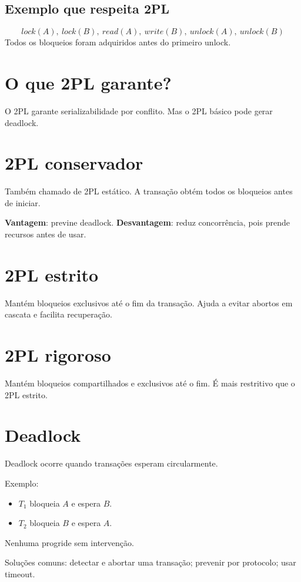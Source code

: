 \documentclass[12pt,a4paper]{article}
\begin{document}
\subsection{Exemplo que respeita 2PL}
\[
lock(A),\ lock(B),\ read(A),\ write(B),\ unlock(A),\ unlock(B)
\]
Todos os bloqueios foram adquiridos antes do primeiro unlock.

\section{O que 2PL garante?}
O 2PL garante serializabilidade por conflito. Mas o 2PL básico pode gerar deadlock.

\section{2PL conservador}
Também chamado de 2PL estático. A transação obtém todos os bloqueios antes de iniciar.

\textbf{Vantagem}: previne deadlock.\newline
\textbf{Desvantagem}: reduz concorrência, pois prende recursos antes de usar.

\section{2PL estrito}
Mantém bloqueios exclusivos até o fim da transação. Ajuda a evitar abortos em cascata e facilita recuperação.

\section{2PL rigoroso}
Mantém bloqueios compartilhados e exclusivos até o fim. É mais restritivo que o 2PL estrito.

\section{Deadlock}
Deadlock ocorre quando transações esperam circularmente.

Exemplo:
\begin{itemize}
    \item $T_1$ bloqueia $A$ e espera $B$.
    \item $T_2$ bloqueia $B$ e espera $A$.
\end{itemize}
Nenhuma progride sem intervenção.

Soluções comuns: detectar e abortar uma transação; prevenir por protocolo; usar timeout.
\end{document}
